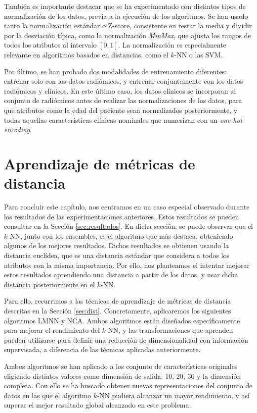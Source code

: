 También es importante destacar que se ha experimentado con distintos tipos de normalización de los datos, previa a la ejecución de los algoritmos. Se han usado tanto la normalización estándar o Z-score, consistente en restar la media y dividir por la desviación típica, como la normalización \emph{MinMax}, que ajusta los rangos de todos los atributos al intervalo $[0, 1]$. La normalización es especialmente relevante en algoritmos basados en distancias, como el $k$-NN o las SVM.

Por último, se han probado dos modalidades de entrenamiento diferentes: entrenar solo con los datos radiómicos, y entrenar conjuntamente con los datos radiómicos y clínicos. En este último caso, los datos clínicos se incorporan al conjunto de radiómicos antes de realizar las normalizaciones de los datos, para que atributos como la edad del paciente sean normalizados posteriormente, y todas aquellas características clínicas nominales que numerizan con un \emph{one-hot encoding}.

\section{Aprendizaje de métricas de distancia}

Para concluir este capítulo, nos centramos en un caso especial observado durante los resultados de las experimentaciones anteriores. Estos resultados se pueden consultar en la Sección \ref{sec:resultados}. En dicha sección, se puede observar que el $k$-NN, junto con los ensembles, es el algoritmo que más destaca, obteniendo algunos de los mejores resultados. Dichos resultados se obtienen usando la distancia euclídea, que es una distancia estándar que considera a todos los atributos con la misma importancia. Por ello, nos planteamos el intentar mejorar estos resultados aprendiendo una distancia a partir de los datos, y usar dicha distancia posteriormente en el $k$-NN.

Para ello, recurrimos a las técnicas de aprendizaje de métricas de distancia descritas en la Sección \ref{sec:dist}. Concretamente, aplicaremos los siguientes algoritmos LMNN y NCA. Ambos algoritmos están diseñados específicamente para mejorar el rendimiento del $k$-NN, y las transformaciones que aprenden pueden utilizarse para definir una reducción de dimensionalidad con información supervisada, a diferencia de las técnicas aplicadas anteriormente. 

Ambos algoritmos se han aplicado a los conjunto de características originales eligiendo distintos valores como dimensión de salida: 10, 20, 30 y la dimensión completa. Con ello se ha buscado obtener nuevas representaciones del conjunto de datos en las que el algoritmo $k$-NN pudiera alcanzar un mayor rendimiento, y así superar el mejor resultado global alcanzado en este problema.

